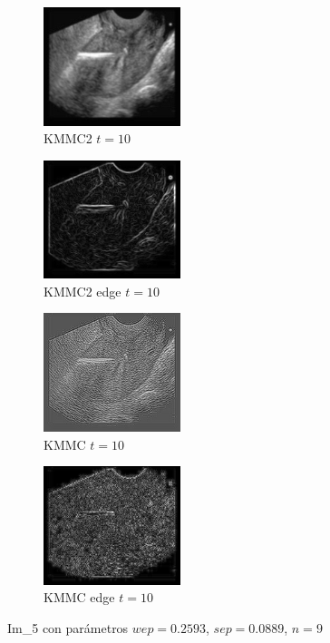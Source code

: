 \documentclass[a4paper,10pt,twocolumn]{article}
\begin{document}
\begin{center}
\begin{figure}[!htb]
		\begin{subfigure}[h!]{4cm}
			\includegraphics[width=4cm]{image/im5/im_5_10}
			\caption{KMMC2 $t = 10$}
		\end{subfigure}
		\begin{subfigure}[i!]{4cm}
			\includegraphics[width=4cm]{image/im5/im_5_10_edge}
			\caption{KMMC2 edge $t = 10$}
		\end{subfigure}
		\begin{subfigure}[j!]{4cm}
			\includegraphics[width=4cm]{image/im5/im_5_10_norm}
			\caption{KMMC $t = 10$}
		\end{subfigure}
		\begin{subfigure}[k!]{4cm}
			\includegraphics[width=4cm]{image/im5/im_5_10_norm_edge}
			\caption{KMMC edge $t = 10$}
		\end{subfigure}
		
		\caption{Im\_5 con par\'ametros $wep = 0.2593$, $sep = 0.0889$, $n = 9$}
	\end{figure}
\end{center}
\end{document}
